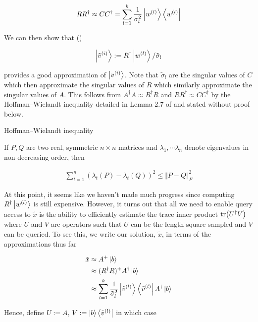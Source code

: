 \documentclass[main.tex]{subfiles}
\begin{document}
{\begin{align*}
RR^\dag \approx CC^\dag = \sum_{l=1}^k \frac{1}{\sigma_l^2}\ket{w^{(l)}}\bra{w^{(l)}}
\end{align*}


We can then show that ()

\begin{align}
\label{def:approx-right}
\ket{\tilde{v}^{(i)}} := R^\dag \ket{w^{(l)}} / \tilde{\sigma}_l
\end{align}

provides a good approximation of $\ket{v^{(i)}}$. Note that $\tilde{\sigma}_l$ are the singular values of $C$ which then approximate the singular values of $R$ which similarly approximate the singular values of $A$. This follows from $A^\dag A \approx R^\dag R$ and $RR^\dag \approx CC^\dag$ by the Hoffman--Wielandt inequality detailed in Lemma 2.7 of \cite{kannan2017randomized} and stated without proof below.

\begin{lemma}Hoffman--Wielandt inequality

	If $P, Q$ are two real, symmetric $n \times n$ matrices and $\lambda_1, \cdots \lambda_n$ denote eigenvalues in non-decreasing order, then
	
	\begin{align*}
		\sum_{t=1}^n(\lambda_t(P) - \lambda_t(Q))^2 \leq \Vert P - Q \Vert_F^2
	\end{align*}
\end{lemma}


At this point, it seems like we haven't made much progress since computing $R^\dag \ket{w^{(l)}}$ is still expensive. However, it turns out that all we need to enable query access to $\tilde{x}$ is the ability to efficiently estimate the trace inner product $\tr(U^\dag V)$ where $U$ and $V$ are operators such that $U$ can be the length-square sampled and $V$ can be queried. To see this, we write our solution, $\tilde{x}$, in terms of the approximations thus far

\begin{align*}
	\tilde{x} &\approx A^+ \ket{b} \\
	&\approx (R^\dag R)^+ A^\dag \ket{b}\\
	&\approx \sum_{l = 1}^k \frac{1}{\tilde{\sigma}_l^2} \ket{\tilde{v}^{(l)}} \bra{\tilde{v}^{(l)}} A^\dag \ket{b}
\end{align*}

Hence, define $U := A$, $V := \ket{b}\bra{\tilde{v}^{(l)}}$ in which case 

}
\end{document}
